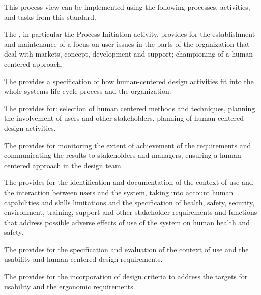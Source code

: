 		\begin{adjustwidth}{2em}{0pt}

			This process view can be implemented using the following processes, activities, and tasks from this standard.

			\begin{compactenum}

				\item The , in particular the Process Initiation activity, provides for the establishment and maintenance of a focus on user issues in the parts of the organization that deal with markets, concept, development and support; championing of a human-centered approach.

				\item The  provides a specification of how human-centered design activities fit into the whole systems life cycle process and the organization.

				\item The  provides for: selection of human centered methods and techniques, planning the involvement of users and other stakeholders, planning of human-centered design activities.

				\item The  provides for monitoring the extent of achievement of the requirements and communicating the results to stakeholders and managers, ensuring a human centered approach in the design team. 

				\item The  provides for the identification and documentation of the context of use and the interaction between users and the system, taking into account human capabilities and skills limitations and the specification of health, safety, security, environment, training, support and other stakeholder requirements and functions that address possible adverse effects of use of the system on human health and safety.

				\item The  provides for the specification and evaluation of the context of use and the usability and human centered design requirements.

				\item The  provides for the incorporation of design criteria to address the targets for usability and the ergonomic requirements.


\end{compactenum}
\end{adjustwidth}
